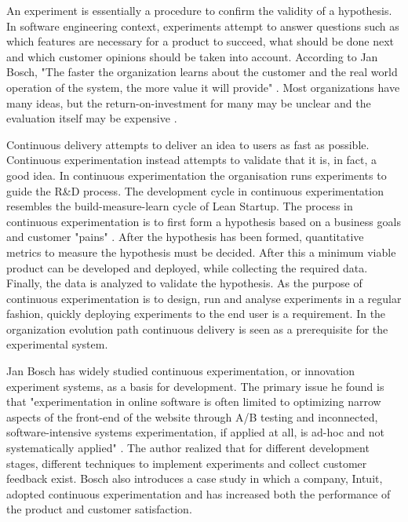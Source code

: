 \documentclass[english, grading]{tktltiki2}
\theoremstyle{definition}
\theoremstyle{remark}
\begin{document}

An experiment is essentially a procedure to confirm the validity of a hypothesis. In software engineering context, experiments attempt to answer questions such as which features are necessary for a product to succeed, what should be done next and which customer opinions should be taken into account. According to Jan Bosch, "The faster the organization learns about the customer and the real world operation of the system, the more value it will provide" \cite{bosch2012building}. Most organizations have many ideas, but the return-on-investment for many may be unclear and the evaluation itself may be expensive \cite{kohavi2007practical}. 

Continuous delivery attempts to deliver an idea to users as fast as possible. Continuous experimentation instead attempts to validate that it is, in fact, a good idea. In continuous experimentation the organisation runs experiments to guide the R\&D process. The development cycle in continuous experimentation resembles the build-measure-learn cycle of Lean Startup. The process in continuous experimentation is to first form a hypothesis based on a business goals and customer "pains" \cite{bosch2012building}. After the hypothesis has been formed, quantitative metrics to measure the hypothesis must be decided. After this a minimum viable product can be developed and deployed, while collecting the required data. Finally, the data is analyzed to validate the hypothesis. As the purpose of continuous experimentation is to design, run and analyse experiments in a regular fashion, quickly deploying experiments to the end user is a requirement. In the organization evolution path \cite{olsson2012climbing} continuous delivery is seen as a prerequisite for the experimental system. 

Jan Bosch has widely studied continuous experimentation, or innovation experiment systems, as a basis for development. The primary issue he found is that "experimentation in online software is often limited to optimizing narrow aspects of the front-end of the website through A/B testing and inconnected, software-intensive systems experimentation, if applied at all, is ad-hoc and not systematically applied" \cite{bosch2012building}. The author realized that for different development stages, different techniques to implement experiments and collect customer feedback exist. Bosch also introduces a case study in which a company, Intuit, adopted continuous experimentation and has increased both the performance of the product and customer satisfaction.
\end{document}
